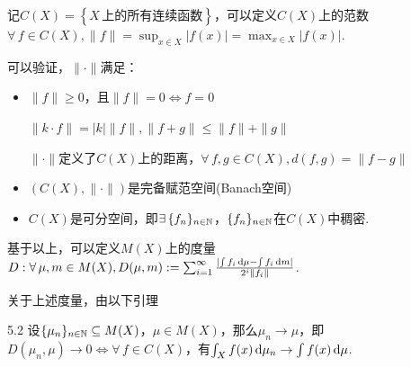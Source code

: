 记$C(X)=\left\{X\,\text{上的所有连续函数}\right\}$，可以定义$C(X)$上的范数$\forall\, f\in C(X),\|f\|=\sup_{x\in X}|f(x)|=\max_{x\in X}|f(x)|$.\par
可以验证，$\|\cdot\|$满足：
\begin{itemize}
    \item $\|f\|\geq 0$，且$\|f\|=0\iff f=0$\par
    $\|k\cdot f\|=|k|\|f\|,\|f+g\|\leq \|f\|+\|g\|$\par
    $\|\cdot\|$定义了$C(X)$上的距离，$\forall\,f,g\in C(X),d(f,g)=\|f-g\|$
    \item $(C(X),\|\cdot\|)$是完备赋范空间(Banach空间)
    \item $C(X)$是可分空间，即$\exists\,\{f_n\}_{n\in\mathbb{N}}$，$\{f_n\}_{n\in\mathbb{N}}$在$C(X)$中稠密.
\end{itemize}\par
基于以上，可以定义$M(X)$上的度量$D:\forall\, \mu,m\in M(X),D(\mu,m):=\sum_{i=1}^\infty\frac{\left|\int f_i\mathop{}\!\mathrm{d}\mu-\int f_i\mathop{}\!\mathrm{d} m\right|}{2^i\|f_i\|}$.\par
关于上述度量，由以下引理
\begin{lemma}{}{5.2}
    设$\{\mu_n\}_{n\in\mathbb{N}}\subseteq M(X)$，$\mu\in M(X)$，那么$\mu_n\to \mu$，即$D(\mu_n,\mu)\to 0\iff\forall\, f\in C(X)$，有$\int_X f(x)\mathop{}\!\mathrm{d}\mu_n\to\int f(x)\mathop{}\!\mathrm{d}\mu$.
\end{lemma}
